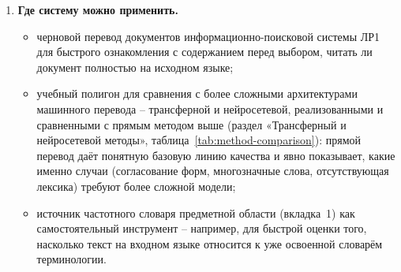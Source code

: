 \begin{enumerate}
\begin{itemize}
    будущее;
    \item кеширование lookup-словаря между запросами перевода (сейчас
    все 87~791 записей перечитываются из БД при каждом переводе, см.
    «Время выполнения») -- ускорило бы обработку текстов на
    коллекциях с частыми повторными переводами;
    \item статистика по словарю (доля непереведённых слов по
    последним $N$ переводам) прямо на вкладке «Словарь» -- подсказывала
    бы, какие слова стоит добавить в первую очередь, вместо ручного
    просмотра частотного списка после каждого перевода;
    \item предметно-ориентированные дополнения словаря (аннотированные
    списки терминов конкретно по онкологии, кардиологии, критике
    живописи и т.\,д.) -- в общем словаре MUSE специализированная
    современная терминология представлена слабо (см. \emph{autoimmune}
    выше), и закрыть такие пробелы может только предметно-ориентированное
    пополнение через утилиту редактирования словаря.
  \end{itemize}
  \item \textbf{Где систему можно применить.}
  \begin{itemize}
    \item черновой перевод документов информационно-поисковой системы
    ЛР1 для быстрого ознакомления с содержанием перед выбором, читать
    ли документ полностью на исходном языке;
    \item учебный полигон для сравнения с более сложными архитектурами
    машинного перевода -- трансферной и нейросетевой, реализованными и
    сравненными с прямым методом выше (раздел «Трансферный и
    нейросетевой методы», таблица~\ref{tab:method-comparison}): прямой
    перевод даёт понятную базовую линию качества и явно показывает,
    какие именно случаи (согласование форм, многозначные слова,
    отсутствующая лексика) требуют более сложной модели;
    \item источник частотного словаря предметной области (вкладка~1)
    как самостоятельный инструмент -- например, для быстрой оценки
    того, насколько текст на входном языке относится к уже освоенной
    словарём терминологии.
  \end{itemize}
\end{enumerate}


